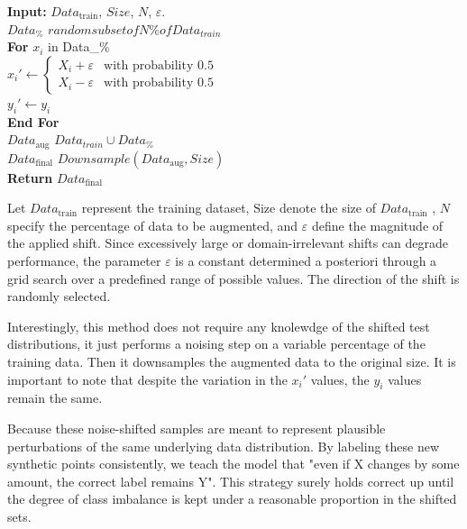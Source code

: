 \begin{algorithm}[H]
    
        \begin{algorithmic}[1]
            \STATE \textbf{Input:} $Data_{\text{train}}$, $Size$, $N$, $\varepsilon$.\\
         
            \State $Data_{\%}$ \leftarrow $random subset of N\% of Data_{train}$\\
                \textbf{For} $x_i$ in Data_{\%}\\
                    \State \phantom{mm} $x_i' \leftarrow 
                    \begin{cases}
                        X_i + \varepsilon & \text{with probability } 0.5 \\
                        X_i - \varepsilon & \text{with probability } 0.5
                    \end{cases}$\\
                    \State \phantom{mm} $y_i' \leftarrow y_i$\\
                \textbf{End For}\\
                \State $Data_\text{aug}$ \leftarrow $Data_{train} \cup Data_{\%}$\\
                \State $Data_\text{final}$ \leftarrow $Downsample(Data_\text{aug}, Size)$\\
            \STATE \textbf{Return} $Data_{\text{final}}$
        \end{algorithmic}
        \caption{Let $Data_{\text{train}}$ represent the training dataset, $\text{Size}$ denote the size of $Data_{\text{train}}$ , $N$ specify the percentage of data to be augmented, and $\varepsilon$ define the magnitude of the applied shift. Since excessively large or domain-irrelevant shifts can degrade performance, the parameter $\varepsilon$ is a constant determined a posteriori through a grid search over a predefined range of possible values. The direction of the shift is randomly selected.}
\end{algorithm}



Interestingly, this method does not require any knolewdge of the shifted test distributions, it just performs a noising step on a variable percentage of the training data. Then it downsamples the augmented data to the original size.
It is important to note that despite the variation in the $x_i'$ values, the $y_i$ values remain the same.

\begin{tcolorbox}[colback=gray!5,colframe=gray!40,title= Why Keep the Same Label?]
    Because these noise-shifted samples are meant to represent plausible perturbations of the same underlying data distribution. By labeling these new synthetic points consistently, we teach the model that "even if X changes by some amount, the correct label remains Y". This strategy surely holds correct up until the degree of class imbalance is kept under a reasonable proportion in the shifted sets.
\end{tcolorbox}





